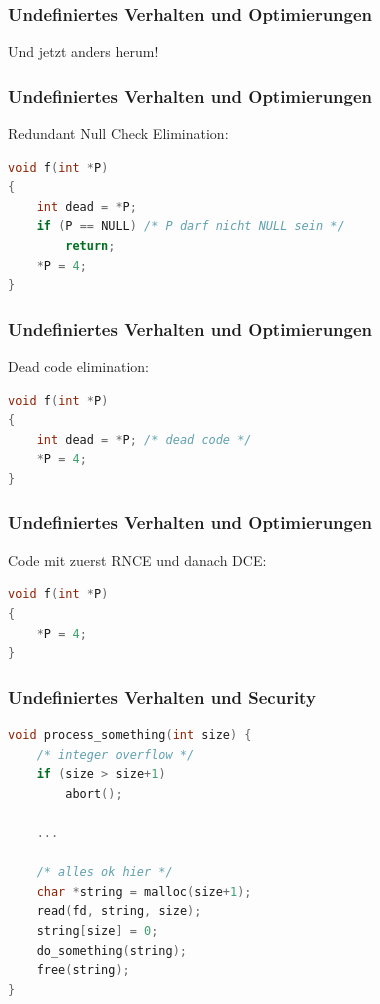 \documentclass[12pt,compress]{beamer}
\begin{document}
\begin{frame}[fragile]
\frametitle{Undefiniertes Verhalten und Optimierungen}

\begin{center}
Und jetzt anders herum!
\end{center}

\end{frame}


\begin{frame}[fragile]
\frametitle{Undefiniertes Verhalten und Optimierungen}

Redundant Null Check Elimination:

\vfill

\begin{lstlisting}[language=C,basicstyle=\ttfamily\small,keywordstyle=\color{red}]
void f(int *P)
{
    int dead = *P;
    if (P == NULL) /* P darf nicht NULL sein */
        return;
    *P = 4;
}
\end{lstlisting}
\end{frame}


\begin{frame}[fragile]
\frametitle{Undefiniertes Verhalten und Optimierungen}

Dead code elimination:

\vfill

\begin{lstlisting}[language=C,basicstyle=\ttfamily\small,keywordstyle=\color{red}]
void f(int *P)
{
    int dead = *P; /* dead code */
    *P = 4;
}
\end{lstlisting}
\end{frame}


\begin{frame}[fragile]
\frametitle{Undefiniertes Verhalten und Optimierungen}

Code mit zuerst RNCE und danach DCE:

\vfill

\begin{lstlisting}[language=C,basicstyle=\ttfamily\small,keywordstyle=\color{red}]
void f(int *P)
{
    *P = 4;
}
\end{lstlisting}
\end{frame}


\begin{frame}[fragile]
\frametitle{Undefiniertes Verhalten und Security}
\begin{lstlisting}[language=C,basicstyle=\ttfamily\small,keywordstyle=\color{red}]
void process_something(int size) {
    /* integer overflow */
    if (size > size+1)
        abort();
    
    ...

    /* alles ok hier */
    char *string = malloc(size+1);
    read(fd, string, size);
    string[size] = 0;
    do_something(string);
    free(string);
}
\end{lstlisting}
\end{frame}
\end{document}
